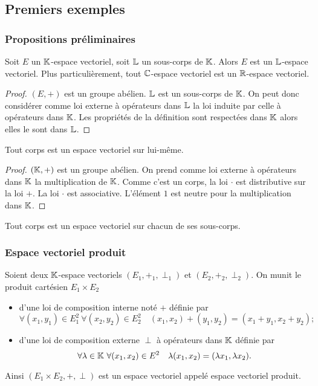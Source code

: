 \subsection{Premiers exemples}
\subsubsection{Propositions préliminaires}
\begin{prop}
  Soit \(E\) un \(\mathbb{K}\)-espace vectoriel, soit \(\mathbb{L}\) un sous-corps de \(\mathbb{K}\). 
  Alors \(E\) est un \(\mathbb{L}\)-espace vectoriel. Plus particulièrement, tout 
  \(\mathbb{C}\)-espace vectoriel est un \(\mathbb{R}\)-espace vectoriel.
\end{prop}
\begin{proof}
  \((E,+)\) est un groupe abélien. \(\mathbb{L}\) est un sous-corps de \(\mathbb{K}\). On peut 
  donc considérer comme loi externe à opérateurs dans \(\mathbb{L}\) la loi induite par 
  celle à opérateurs dans \(\mathbb{K}\). Les propriétés de la définition sont 
  respectées dans \(\mathbb{K}\) alors elles le sont dans \(\mathbb{L}\).
\end{proof}
\begin{prop}
  Tout corps est un espace vectoriel sur lui-même.
\end{prop}
\begin{proof}
  \((\mathbb{K},+)\) est un groupe abélien. On prend comme loi externe à opérateurs dans 
  \(\mathbb{K}\) la multiplication de \(\mathbb{K}\). Comme c'est un corps, la loi \(\cdot\) est 
  distributive sur la loi \(+\). La loi \(\cdot\) est associative. L'élément 
  \(1\) est neutre pour la multiplication dans \(\mathbb{K}\).
\end{proof}
\begin{cor}
  Tout corps est un espace vectoriel sur chacun de ses sous-corps.
\end{cor}

\subsubsection{Espace vectoriel produit}

Soient deux \(\mathbb{K}\)-espace vectoriels \((E_1,+_1,\perp_1)\) et 
\((E_2,+_2,\perp_2)\). On munit le produit cartésien \(E_1 \times E_2\)
\begin{itemize}
  \item d'une loi de composition interne noté \(+\) définie par
    \begin{equation}
      \forall (x_1, y_1)\in E_1^2 \ \forall (x_2, y_2) \in E_2^2 \quad (x_1,x_2) 
      + (y_1,y_2) = (x_1+y_1,x_2+y_2);
    \end{equation}
  \item d'une loi de composition externe \(\perp\) à opérateurs dans \(\mathbb{K}\) 
    définie par
    \begin{equation}
      \forall \lambda \in \mathbb{K} \ \forall (x_1,x_2) \in E^2 \quad 
      \lambda(x_1,x_2)=(\lambda x_1, \lambda x_2).
    \end{equation}
\end{itemize}
Ainsi \((E_1 \times E_2,+,\perp)\) est un espace vectoriel appelé espace 
vectoriel produit.

